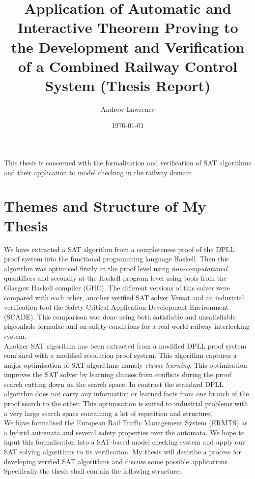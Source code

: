 \documentclass{article}
\title{Application of Automatic and Interactive Theorem Proving to the Development and Verification of a Combined Railway Control System (Thesis Report)}
\date{\today}
\author{ 
   Andrew Lawrence}
\begin{document}
\maketitle



This thesis is concerned with the formalisation and verification of SAT algorithms and their application to model checking in the railway domain. \smallskip \\


\section{Themes and Structure of My Thesis}
%
We have extracted a SAT algorithm from a completeness proof of the DPLL proof system into the functional programming language Haskell. Then this algorithm was optimised firstly at the proof level using \emph{non-computational} quantifiers and secondly at the Haskell program level using tools from the Glasgow Haskell compiler (GHC). The different versions of this solver were compared with each other, another verified SAT solver Versat and an industrial verification tool the Safety Critical Application Development Environment (SCADE). This comparison was done using both satisfiable and unsatisfiable pigeonhole formulae and on safety conditions for a real world railway interlocking system.  \smallskip \\
%
Another SAT algorithm has been extracted from a modified DPLL proof system combined with a modified resolution proof system. This algorithm captures a major optimisation of SAT algorithms namely \emph{clause learning}. This optimisation improves the SAT solver by learning clauses from conflicts during the proof search cutting down on the search space. In contrast the standard DPLL algorithm does not carry any information or learned facts from one branch of the proof search to the other. This optimisation is suited to industrial problems with a very large search space containing a lot of repetition and structure.  \smallskip \\
%
We have formalised the European Rail Traffic Management System (ERMTS) as a hybrid automata and several safety properties over the automata. We hope to input this formalisation into a SAT-based  model checking system and apply our SAT solving algorithms to its verification.
%
My thesis will describe a process for developing verified SAT algorithms and discuss some possible applications. Specifically the thesis shall contain the following structure:
\end{document}
